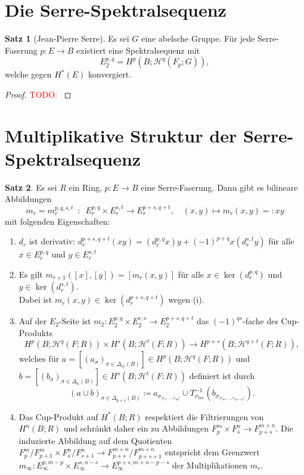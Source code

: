 \documentclass[11pt, a4paper, german]{article}
\theoremstyle{definition}
\newtheorem{satz}{Satz}
\theoremstyle{remark}
\newcommand{\TODO}[1]{\textcolor{red}{TODO: #1}} %
\newcommand{\angles}[1]{{\langle #1 \rangle}}
\newcommand{\LH}{\mathcal{H}} %
\begin{document}
\section{Die Serre-Spektralsequenz}

\begin{satz}[Jean-Pierre Serre]
  Es sei $G$ eine abelsche Gruppe.
  Für jede Serre-Faserung $p : E \to B$ existiert eine Spektralsequenz mit
  \[ E_2^{p,q} = H^p(B; \LH^q(F_p; G)), \]
  welche gegen $H^*(E)$ konvergiert.
\end{satz}

\begin{proof}
  \TODO{}
\end{proof}

\section{Multiplikative Struktur der Serre-Spektralsequenz}

\begin{satz}
  Es sei $R$ ein Ring, $p : E \to B$ eine Serre-Faserung.
  Dann gibt es bilineare Abbildungen
  \[
    m_r = m_r^{p,q,s,t} \enspace:\enspace E^{p,q}_r \times E^{s,t}_r \to E^{p+s,q+t}_r, \quad
    (x, y) \mapsto m_r(x, y) =: xy
  \]
  mit folgenden Eigenschaften:
  \begin{enumerate}[label=(\roman*)]
    \item $d_r$ ist derivativ: $d_r^{p+s,q+t}(xy) = (d_r^{p,q} x) y + (-1)^{p+q} x (d_r^{s,t} y)$ für alle $x \in E^{p,q}_r$ und $y \in E^{s,t}_r$
    \item Es gilt $m_{r+1}([x], [y]) = [m_r(x, y)]$ für alle $x \in \ker(d_r^{p,q})$ und $y \in \ker(d_r^{s,t})$. \\
    Dabei ist $m_r(x, y) \in \ker(d_r^{p+s,q+t})$ wegen (i).
    \item Auf der $E_2$-Seite ist $m_2 : E_2^{p,q} \!\times\! E_2^{r,s} \!\to\! E_2^{p+s,q+t}$ das $(-1)^{qs}$-fache des Cup-Produkts
    \[
      H^p(B; \LH^q(F; R)) \times H^s(B; \LH^t(F; R)) \to H^{p+s}(B; \LH^{q+t}(F; R)),
    \]
    welches für $a = [(a_\sigma)_{\sigma \in \Delta_m(B)}] \in H^p(B; \LH^q(F; R))$ und $b = [(b_\sigma)_{\sigma \in \Delta_n(B)}] \in H^s(B; \LH^t(F; R))$ definiert ist durch
    \[
      (a \cup b)_{\sigma \in \Delta_{p+s}(B)} \coloneqq
      a_{\sigma_{\angles{e_1, \ldots, e_m}}} \cup T_{\sigma_{0m}}^{-1}(b_{\sigma_{\angles{e_m, \ldots, e_{m+n}}}}).
    \]
    \item Das Cup-Produkt auf $H^*(B; R)$ respektiert die Filtrierungen von $H^n(B; R)$ und schränkt daher ein zu Abbildungen $F_p^m \times F_s^n \to F_{p+s}^{m+n}$.
    Die induzierte Abbildung auf dem Quotienten $F^m_p/F^m_{p+1} \times F^n_s/F^n_{s+1} \to F^{m+n}_{p+s} / F^{m+n}_{p+s+1}$ entspricht dem Grenzwert $m_\infty : E_\infty^{p,m-p} \times E_\infty^{s,n-s} \to E_\infty^{p+s,m+n-p-s}$ der Multiplikationen $m_r$.
  \end{enumerate}
\end{satz}
\end{document}
